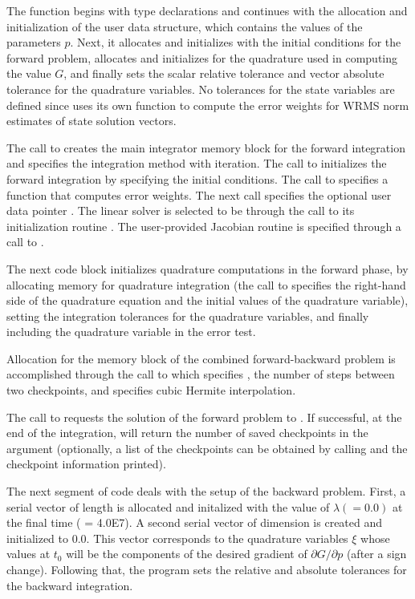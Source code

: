 The  function begins with type declarations and continues with the
allocation and initialization of the user data structure, which contains the values 
of the parameters $p$. Next, it allocates and
initializes  with the initial conditions for the forward problem, allocates and 
initializes  for the quadrature used in computing the value $G$, and finally
sets the scalar relative tolerance  and vector absolute tolerance
 for the quadrature variables.
No tolerances for the state variables are defined since 
uses its own function to compute the error weights for WRMS norm
estimates of state solution vectors.

The call to  creates the main integrator memory block for the 
forward integration and specifies the  integration method with 
 iteration. 
The call to  initializes the forward integration by specifying the 
initial conditions.
The call to  specifies a function that computes error weights.
The next call specifies the optional user data pointer .
The linear solver is selected to be {\cvdense} through the call to its 
initialization routine . The user-provided Jacobian routine 
is specified through a call to .

The next code block initializes quadrature computations in the forward phase, by
allocating {\cvodes} memory for quadrature integration (the call to
 specifies the right-hand side  of the quadrature
equation and the initial values of the quadrature variable),
setting the integration tolerances for the quadrature variables, and finally
including the quadrature variable in the error test.

Allocation for the memory block of the combined forward-backward
problem is accomplished through the call to  which
specifies , the number of steps between two
checkpoints, and specifies cubic Hermite interpolation.

The call to  requests the solution of the forward problem to .
If successful, at the end of the integration,  will return the number
of saved checkpoints in the argument  (optionally, a list of the
checkpoints can be obtained by calling  and the
checkpoint information printed).

The next segment of code deals with the setup of the backward problem. 
First, a serial vector  of length  is allocated and initalized with the
value of $\lambda (= 0.0)$ at the final time ( = 4.0E7).  A second
serial vector  of dimension  is created and initialized to $0.0$.
This vector corresponds to the quadrature variables $\xi$ whose values at $t_0$
will be the components of the desired gradient of $\partial G / \partial p$
(after a sign change).
Following that, the program sets the relative and absolute tolerances
for the backward integration.

